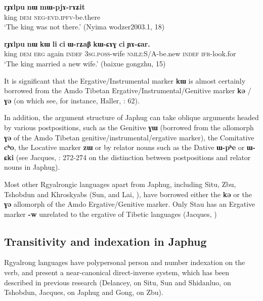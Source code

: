 \documentclass[oneside,a4paper,11pt]{article}
\newcommand{\ipa}[1]{{\phon\textbf{\mbox{#1}}}} %
\begin{document}
 \begin{exe}
\ex \label{ex:abs}
\gll
\ipa{rɟɤlpu}  	\ipa{nɯ}  	\ipa{mɯ-pjɤ-rɤʑit}  \\
king \textsc{dem} \textsc{neg-evd.ipfv}-be.there \\
 \glt `The king was not there.' (Nyima wodzer2003.1, 18)
\end{exe}

 \begin{exe}
\ex \label{ex:erg}
\gll 
\ipa{rɟɤlpu}  	\ipa{nɯ}  	\ipa{kɯ}  	\ipa{li}  	\ipa{ci}  	\ipa{ɯ-rʑaβ}  	\ipa{kɯ-ɕɤɣ}  	\ipa{ci}  	\ipa{ɲɤ-ɕar.}  	 \\
king \textsc{dem} \textsc{erg} again \textsc{indef} \textsc{3sg.poss}-wife \textsc{nmlz}:S/A-be.new \textsc{indef}  \textsc{ifr}-look.for \\
\glt `The king married a new wife.' (baixue gongzhu, 15)
\end{exe}

It is significant that the Ergative/Instrumental marker \ipa{kɯ} is almost certainly borrowed from the Amdo Tibetan Ergative/Instrumental/Genitive marker \ipa{kə} / \ipa{ɣə} (on which see, for instance, Haller, \citeyear{haller04themchen}: 62).

In addition, the argument structure of Japhug can take oblique arguments headed by various postpositions, such as the Genitive \ipa{ɣɯ} (borrowed from the allomorph \ipa{ɣə} of the Amdo Tibetan genitive/instrumental/ergative marker), the Comitative \ipa{cʰo}, the Locative marker \ipa{zɯ} or by relator nouns such as the Dative  \ipa{ɯ-pʰe} or \ipa{ɯ-ɕki} (see Jacques, \citeyear{jacques14linking}: 272-274 on the distinction between postpositions and relator nouns in Japhug).

Most other Rgyalrongic languages apart from Japhug, including Situ, Zbu, Tshobdun and Khroskyabs (Sun, \citeyear{jackson98morphology} and Lai, \citeyear{lai13affixale}), have borrowed either the \ipa{kə} or the \ipa{ɣə} allomorph of the Amdo  Ergative/Genitive marker. Only Stau has an Ergative marker \ipa{-w} unrelated to the ergative of Tibetic languages (Jacques, \citeyear{jacques14rtau})

\subsection{Transitivity and indexation in Japhug}
Rgyalrong languages have polypersonal person and number indexation on the verb, and present a near-canonical direct-inverse system, which has been described in previous research (Delancey, \citeyear{delancey81direction} on Situ,  Sun and Shidanluo, \citeyear{jackson02rentongdengdi} on Tshobdun,  Jacques, \citeyear{jacques10inverse} on Japhug and Gong, \citeyear{gongxun14agreement} on Zbu). 
\end{document}
